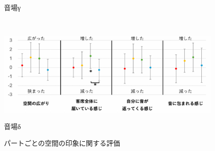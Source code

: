 \documentclass[11pt,a4j]{jreport}
\begin{document}
\begin{figure}[H]
\begin{minipage}{1\linewidth}
    \caption*{音場γ}
    \label{fig:空間の印象γ}
  \end{minipage}
  \\
  \vspace{1\baselineskip}
  \begin{minipage}{1\linewidth}
    \centering
    \includegraphics[scale=.55]{images/subjectiveExp/statisticAnalysis/part_space_d.pdf}
    \caption*{音場δ}
    \label{fig:空間の印象δ}
  \end{minipage}
  
  \caption{パートごとの空間の印象に関する評価}
  \label{fig:パートごとの空間の印象に関する評価}
\end{figure}
\end{document}
